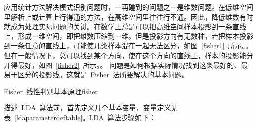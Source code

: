 \begin{enumerate}
应用统计方法解决模式识别问题时，一再碰到的问题之一是维数问题。在低维空间里解析上或计算上行得通的方法，在高维空间里往往行不通。因此，降低维数有时就成为处理实际问题的关键。在数学上总是可以把高维空间样本投影到一条直线上，形成一维空间，即把维数压缩到一维。但是投影方向有无数种，若把样本投影到一条任意的直线上，可能使几类样本混在一起无法区分，如图~\ref{fisher1}~所示。。但在一般情况下，总可以找到某个方向，使在这个方向的直线上，样本的投影能分开得最好，如图~\ref{fisher2}~所示。。 问题是如何根据实际情况找到这条最好的、最易于区分的投影线。这就是~Fisher~法所要解决的基本问题。\par

\begin{pics}[htbp]{Fisher~线性判别基本原理}{fisher}
\end{pics}

		 描述~LDA~算法前，首先定义几个基本变量，变量定义见表~\ref{ldaparameterdeftable}。LDA~算法步骤如下：


\end{enumerate}
